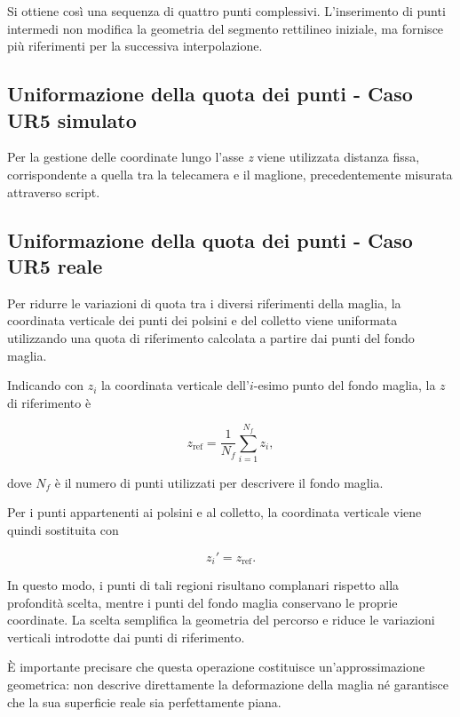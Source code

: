 Si ottiene così una sequenza di quattro punti complessivi. L'inserimento di punti intermedi non modifica la geometria del segmento rettilineo iniziale, ma fornisce più riferimenti per la successiva interpolazione.

\subsection{Uniformazione della quota dei punti - Caso UR5 simulato}

Per la gestione delle coordinate lungo l'asse \textit{z} viene utilizzata distanza fissa, corrispondente a quella tra la telecamera e il maglione, precedentemente misurata attraverso script.

\subsection{Uniformazione della quota dei punti - Caso UR5 reale}

Per ridurre le variazioni di quota tra i diversi riferimenti della maglia, la coordinata verticale dei punti dei polsini e del colletto viene uniformata utilizzando una quota di riferimento calcolata a partire dai punti del fondo maglia.

Indicando con $z_i$ la coordinata verticale dell'$i$-esimo punto del fondo maglia, la $z$ di riferimento è

\begin{equation}
    z_{\mathrm{ref}}
    = \frac{1}{N_f}\sum_{i=1}^{N_f} z_i,
    \label{eq:quota_riferimento}
\end{equation}

dove $N_f$ è il numero di punti utilizzati per descrivere il fondo maglia.

Per i punti appartenenti ai polsini e al colletto, la coordinata verticale viene quindi sostituita con

\begin{equation}
    z_i' = z_{\mathrm{ref}}.
\end{equation}

In questo modo, i punti di tali regioni risultano complanari rispetto alla profondità scelta, mentre i punti del fondo maglia conservano le proprie coordinate. La scelta semplifica la geometria del percorso e riduce le variazioni verticali introdotte dai punti di riferimento.

È importante precisare che questa operazione costituisce un'approssimazione geometrica: non descrive direttamente la deformazione della maglia né garantisce che la sua superficie reale sia perfettamente piana.

